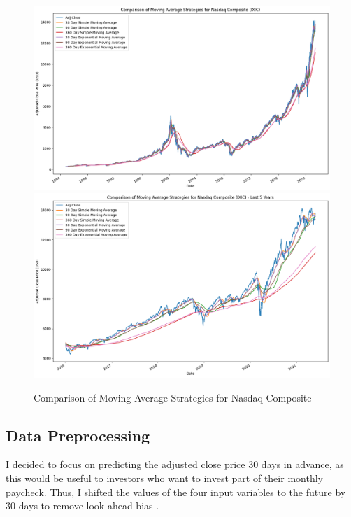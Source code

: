 \documentclass[a4paper, 11pt]{article}
\begin{document}
\begin{figure}[H]
    \begin{center}
        \includegraphics[width=1\textwidth]{Comparison of Moving Average Strategies for Nasdaq Composite.png}
        \includegraphics[width=1\textwidth]{Comparison of Moving Average Strategies for Nasdaq Composite (Last 5 Years).png}
        \caption{Comparison of Moving Average Strategies for Nasdaq Composite}
    \end{center}
\end{figure}

\subsection{Data Preprocessing}
I decided to focus on predicting the adjusted close price 30 days in advance, as this would be useful to investors who want to invest part of their monthly paycheck. Thus, I shifted the values of the four input variables to the future by 30 days to remove look-ahead bias \cite{baquero2005survival}.
\end{document}
